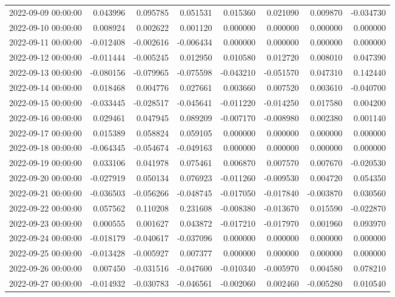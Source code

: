 \begin{tabular}{lrrrrrrr}
2022-09-09 00:00:00 & 0.043996 & 0.095785 & 0.051531 & 0.015360 & 0.021090 & 0.009870 & -0.034730 \\
2022-09-10 00:00:00 & 0.008924 & 0.002622 & 0.001120 & 0.000000 & 0.000000 & 0.000000 & 0.000000 \\
2022-09-11 00:00:00 & -0.012408 & -0.002616 & -0.006434 & 0.000000 & 0.000000 & 0.000000 & 0.000000 \\
2022-09-12 00:00:00 & -0.011444 & -0.005245 & 0.012950 & 0.010580 & 0.012720 & 0.008010 & 0.047390 \\
2022-09-13 00:00:00 & -0.080156 & -0.079965 & -0.075598 & -0.043210 & -0.051570 & 0.047310 & 0.142440 \\
2022-09-14 00:00:00 & 0.018468 & 0.004776 & 0.027661 & 0.003660 & 0.007520 & 0.003610 & -0.040700 \\
2022-09-15 00:00:00 & -0.033445 & -0.028517 & -0.045641 & -0.011220 & -0.014250 & 0.017580 & 0.004200 \\
2022-09-16 00:00:00 & 0.029461 & 0.047945 & 0.089209 & -0.007170 & -0.008980 & 0.002380 & 0.001140 \\
2022-09-17 00:00:00 & 0.015389 & 0.058824 & 0.059105 & 0.000000 & 0.000000 & 0.000000 & 0.000000 \\
2022-09-18 00:00:00 & -0.064345 & -0.054674 & -0.049163 & 0.000000 & 0.000000 & 0.000000 & 0.000000 \\
2022-09-19 00:00:00 & 0.033106 & 0.041978 & 0.075461 & 0.006870 & 0.007570 & 0.007670 & -0.020530 \\
2022-09-20 00:00:00 & -0.027919 & 0.050134 & 0.076923 & -0.011260 & -0.009530 & 0.004720 & 0.054350 \\
2022-09-21 00:00:00 & -0.036503 & -0.056266 & -0.048745 & -0.017050 & -0.017840 & -0.003870 & 0.030560 \\
2022-09-22 00:00:00 & 0.057562 & 0.110208 & 0.231608 & -0.008380 & -0.013670 & 0.015590 & -0.022870 \\
2022-09-23 00:00:00 & 0.000555 & 0.001627 & 0.043872 & -0.017210 & -0.017970 & 0.001960 & 0.093970 \\
2022-09-24 00:00:00 & -0.018179 & -0.040617 & -0.037096 & 0.000000 & 0.000000 & 0.000000 & 0.000000 \\
2022-09-25 00:00:00 & -0.013428 & -0.005927 & 0.007377 & 0.000000 & 0.000000 & 0.000000 & 0.000000 \\
2022-09-26 00:00:00 & 0.007450 & -0.031516 & -0.047600 & -0.010340 & -0.005970 & 0.004580 & 0.078210 \\
2022-09-27 00:00:00 & -0.014932 & -0.030783 & -0.046561 & -0.002060 & 0.002460 & -0.005280 & 0.010540 \\

\end{tabular}
